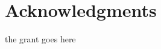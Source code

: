 \documentclass{aamas2016}
\begin{document}
\section*{Acknowledgments}
{\color{red} 
the grant goes here
}



%
\end{document}
